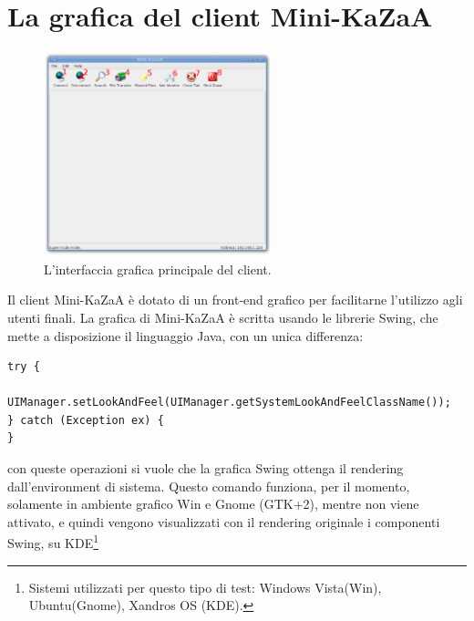 \section{La grafica del client Mini-KaZaA}\label{sec:grafica}
\begin{figure}[t]
 \centering
 \includegraphics[width=250px,height=225px,bb=14 14 841 737]{images/mini_kazaa_client.eps}
 \caption{L'interfaccia grafica principale del client.}
 \label{fig:mini_kazaa_client}
\end{figure}
Il client Mini-KaZaA è dotato di un front-end grafico per facilitarne l'utilizzo agli utenti finali. La grafica di Mini-KaZaA è scritta usando le librerie Swing, che mette a disposizione il linguaggio Java, con un unica differenza:
\begin{lstlisting}
try {
	UIManager.setLookAndFeel(UIManager.getSystemLookAndFeelClassName());
} catch (Exception ex) {
}
\end{lstlisting}
con queste operazioni si vuole che la grafica Swing ottenga il rendering dall'environment di sistema. Questo comando funziona, per il momento, solamente in ambiente grafico Win e Gnome (GTK+2), mentre non viene attivato, e quindi vengono visualizzati con il rendering originale i componenti Swing, su KDE\footnote{Sistemi utilizzati per questo tipo di test: Windows Vista(Win), Ubuntu(Gnome), Xandros OS (KDE).}

